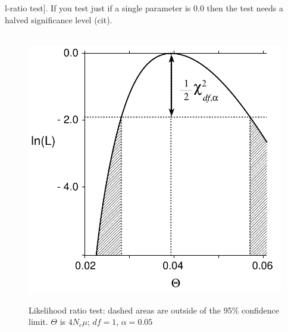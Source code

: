 l-ratio test]. If you test just if a single parameter is 0.0 then the test needs a halved significance level (cit).
\begin{figure}[htb]
\begin{center}
\leavevmode
\hbox{%
\includegraphics[scale=0.6]{mim/coalesce_likecurve}}
\end{center}
\caption{Likelihood ratio test: dashed areas are outside of the 95\% confidence limit. $\Theta$ is $4 N_e \mu$; $df=1$, $\alpha=0.05$ \label{LRATIOFIG}}
\end{figure}


